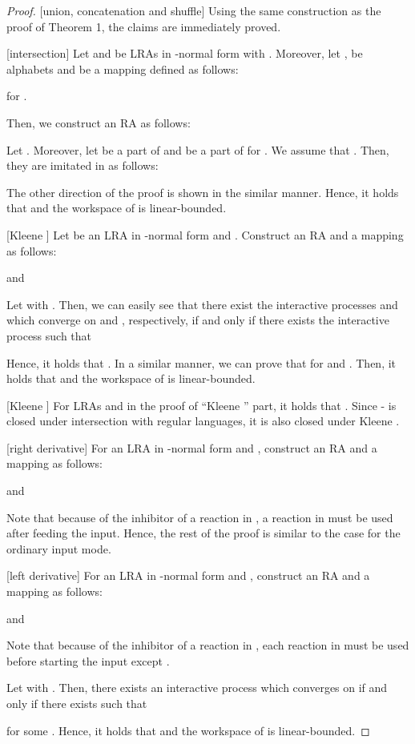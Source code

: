\documentclass[preprint,fleqn,1p]{elsarticle}
\begin{document}
\begin{proof}

[union, concatenation and shuffle] Using the same construction as the proof of Theorem 1, the claims are immediately proved. 

[intersection] Let  and  be LRAs in -normal form with . Moreover, let ,  be alphabets and  be a mapping defined as follows:

for . 

Then, we construct an RA  as follows:

Let . 
Moreover, let  be a part of  and  be a part of  for . We assume that . Then, they are imitated in  as follows:


The other direction of the proof is shown in the similar manner.
Hence, it holds that  and the workspace of  is linear-bounded.

[Kleene ] Let  be an LRA in -normal form and . Construct an RA  and a mapping  as follows:

and

Let  with .
Then, we can easily see that there exist the interactive processes  and  which converge on  and , respectively, if and only if there exists the interactive process  such that

Hence, it holds that .
In a similar manner, we can prove that  for  and .
Then, it holds that  and the workspace of  is linear-bounded.

[Kleene ] For LRAs  and  in the proof of ``Kleene '' part, it holds that .  Since - is closed under intersection with regular languages, it is also closed under  Kleene .

[right derivative]  For an LRA  in -normal form and , construct an RA  and a mapping  as follows:

and

Note that because of the inhibitor of a reaction in , a reaction in  must be used after feeding the input. 
Hence, the rest of the proof is similar to the case for the ordinary input mode.

[left derivative] For an LRA  in -normal form and , construct an RA  and a mapping  as follows:

and

Note that because of the inhibitor of a reaction in , each reaction in  must be used before starting the input except .

Let  with . Then, there exists an interactive process  which converges on  if and only if there exists  such that

for some .
Hence, it holds that  and the workspace of  is linear-bounded.


\end{proof}
\end{document}

